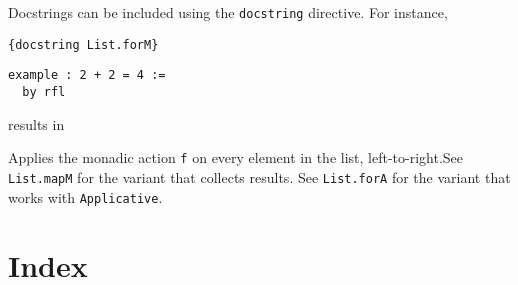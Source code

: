 \documentclass{memoir}
\begin{document}
Docstrings can be included using the \verb|docstring| directive. For instance,

\begin{verbatim}
{docstring List.forM}

\end{verbatim}


\begin{verbatim}
example : 2 + 2 = 4 :=
  by rfl

\end{verbatim}


results in

Applies the monadic action \verb|f| on every element in the list, left-to-right.See \verb|List.mapM| for the variant that collects results.
See \verb|List.forA| for the variant that works with \verb|Applicative|.




\chapter{Index}
\end{document}
